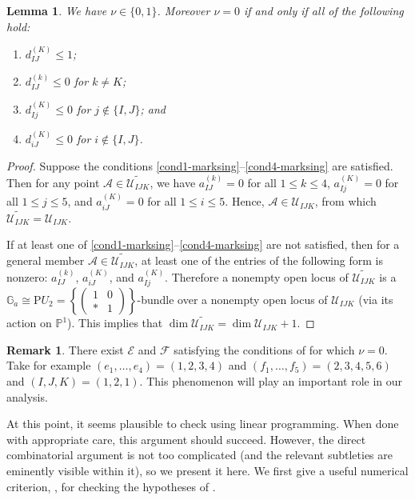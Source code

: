 \documentclass[11pt]{amsart}
\numberwithin{theorem}{section}
\numberwithin{equation}{section}
\newtheorem{lemma}[theorem]{Lemma}
\theoremstyle{definition}\newtheorem{defn}[theorem]{Definition}
\theoremstyle{definition}\newtheorem{remark}[theorem]{Remark}
\theoremstyle{definition}\newtheorem{question}[theorem]{Question}
\theoremstyle{definition}\newtheorem{problem}[theorem]{Problem}
\newcommand{\PP}{\mathbb{P}}
\newcommand{\cE}{\mathcal{E}}
\newcommand{\cF}{\mathcal{F}}
\newcommand{\cA}{\mathcal{A}}
\newcommand{\GG}{\mathbb{G}}
\newcommand{\mymat}[4]{\ensuremath{\left( \begin{smallmatrix} #1 & #2 \\ #3 & #4 \end{smallmatrix} \right)}}
\newcommand{\marksing}{\mathcal{U}}
\newcommand{\I}{I}
\newcommand{\J}{J}
\newcommand{\K}{K}
\begin{document}
\begin{lemma}
\label{lem:nu-bound}
We have $\nu \in \{0,1\}$. Moreover $\nu = 0$ if and only if all of the following hold:
\begin{enumerate}[label=(\roman*)]
    \item \label{cond1-marksing} $d^{(\K)}_{\I\J} \leq 1$;
    \item $d^{(k)}_{\I\J} \leq 0$ for $k \neq \K$; 
    \item $d^{(\K)}_{\I j} \leq 0$ for $j \notin \{\I,\J\}$; and 
    \item \label{cond4-marksing}$d^{(\K)}_{i \J} \leq 0$ for $i \notin \{\I,\J\}$.
\end{enumerate}
\end{lemma}
\begin{proof}
Suppose the conditions \ref{cond1-marksing}--\ref{cond4-marksing} are satisfied. Then for any point $\cA \in \widetilde{\marksing_{\I\J\K}}$, we have $a_{\I\J}^{(k)} = 0$ for all $1 \leq k \leq 4$, $a_{Ij}^{(\K)} = 0$ for all $1 \leq j \leq 5$, and $a_{i\J}^{(\K)} = 0$ for all $1 \leq i \leq 5$. Hence, $\cA \in \marksing_{\I\J\K}$, from which $\widetilde{\marksing_{\I\J\K}} = \marksing_{\I\J\K}$.

If at least one of \ref{cond1-marksing}--\ref{cond4-marksing} are not satisfied, then for a general member $\cA \in \widetilde{\marksing_{\I\J\K}}$, at least one of the entries of the following form is nonzero: $a_{\I\J}^{(k)}$, $a_{i\J}^{(\K)}$, and $a_{Ij}^{(\K)}$. Therefore a nonempty open locus of $\widetilde{\marksing_{\I\J\K}}$ is a $\GG_a \cong \mathrm{P}U_2 = \left\{ \mymat{1}{0}{*}{1} \right\}$-bundle over a nonempty open locus of $\marksing_{\I\J\K}$ (via its action on $\PP^1$). This implies that $\dim \widetilde{\marksing_{\I\J\K}} = \dim\marksing_{\I\J\K} + 1$.
\end{proof}

\begin{remark}
There exist $\cE$ and $\cF$ satisfying the conditions of  for which $\nu = 0$. Take for example $(e_1,\dots,e_4) = (1,2,3,4)$ and $(f_1,\dots,f_5) = (2,3,4,5,6)$ and $(\I,\J,\K) = (1,2,1)$. This phenomenon will play an important role in our analysis.
\end{remark}

At this point, it seems plausible to check  using linear programming. When done with appropriate care, this argument should succeed. However, the direct combinatorial argument is not too complicated (and the relevant subtleties are eminently visible within it), so we present it here.
We first give a useful numerical criterion, , for checking the hypotheses of .
\end{document}
